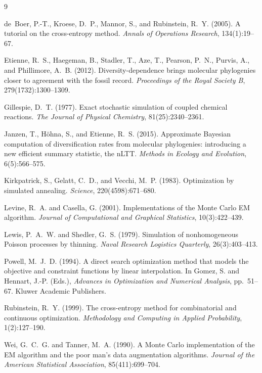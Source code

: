 \documentclass[12pt,a4paper]{article}
\begin{document}

\begin{thebibliography}{9}

de~Boer, P.-T., Kroese, D.~P., Mannor, S., and Rubinstein, R.~Y. (2005).
A tutorial on the cross-entropy method.
\textit{Annals of Operations Research}, 134(1):19--67.

Etienne, R.~S., Haegeman, B., Stadler, T., Aze, T., Pearson, P.~N.,
Purvis, A., and Phillimore, A.~B. (2012).
Diversity-dependence brings molecular phylogenies closer to agreement with
the fossil record.
\textit{Proceedings of the Royal Society B}, 279(1732):1300--1309.

Gillespie, D.~T. (1977).
Exact stochastic simulation of coupled chemical reactions.
\textit{The Journal of Physical Chemistry}, 81(25):2340--2361.

Janzen, T., H\"{o}hna, S., and Etienne, R.~S. (2015).
Approximate Bayesian computation of diversification rates from molecular
phylogenies: introducing a new efficient summary statistic, the nLTT.
\textit{Methods in Ecology and Evolution}, 6(5):566--575.

Kirkpatrick, S., Gelatt, C.~D., and Vecchi, M.~P. (1983).
Optimization by simulated annealing.
\textit{Science}, 220(4598):671--680.

Levine, R.~A. and Casella, G. (2001).
Implementations of the Monte Carlo EM algorithm.
\textit{Journal of Computational and Graphical Statistics}, 10(3):422--439.

Lewis, P.~A.~W. and Shedler, G.~S. (1979).
Simulation of nonhomogeneous Poisson processes by thinning.
\textit{Naval Research Logistics Quarterly}, 26(3):403--413.

Powell, M.~J.~D. (1994).
A direct search optimization method that models the objective and constraint
functions by linear interpolation.
In Gomez, S. and Hennart, J.-P. (Eds.),
\textit{Advances in Optimization and Numerical Analysis}, pp.~51--67.
Kluwer Academic Publishers.

Rubinstein, R.~Y. (1999).
The cross-entropy method for combinatorial and continuous optimization.
\textit{Methodology and Computing in Applied Probability}, 1(2):127--190.

Wei, G.~C.~G. and Tanner, M.~A. (1990).
A Monte Carlo implementation of the EM algorithm and the poor man's data
augmentation algorithms.
\textit{Journal of the American Statistical Association}, 85(411):699--704.

\end{thebibliography}
\end{document}
